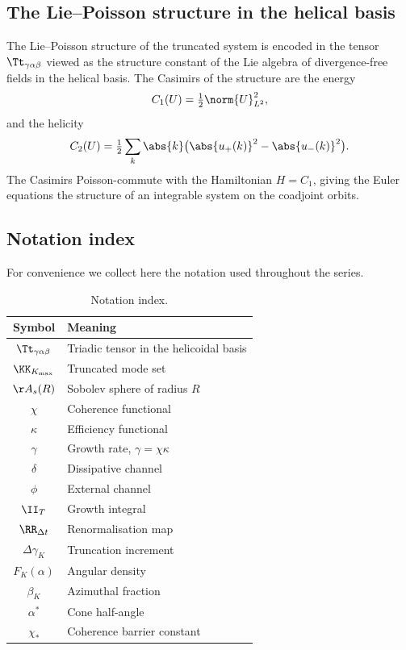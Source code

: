 \subsection{The Lie--Poisson structure in the helical basis}
\label{app:LiePoisson-helical}

The Lie--Poisson structure of the truncated system is encoded in the 
tensor $\Tt_{\gamma\alpha\beta}$ viewed as the structure constant of 
the Lie algebra of divergence-free fields in the helical basis. The 
Casimirs of the structure are the energy
\begin{equation}\label{eq:casimir-1}
C_1(U) = \tfrac12\norm{U}_{L^2}^2,
\end{equation}
and the helicity
\begin{equation}\label{eq:casimir-2}
C_2(U) = \tfrac12\sum_k\abs{k}\bigl(\abs{u_+(k)}^2 - \abs{u_-(k)}^2\bigr).
\end{equation}
The Casimirs Poisson-commute with the Hamiltonian $H = C_1$, 
giving the Euler equations the structure of an integrable system on 
the coadjoint orbits.

\subsection{Notation index}
\label{app:notation}

For convenience we collect here the notation used throughout the 
series.

\begin{table}[h]
\centering
\caption{Notation index.}
\label{tab:notation}
\begin{tabular}{cl}
\toprule
Symbol & Meaning \\
\midrule
$\Tt_{\gamma\alpha\beta}$ & Triadic tensor in the helicoidal basis \\
$\KK_{K_{\max}}$ & Truncated mode set \\
$\AA_s(R)$ & Sobolev sphere of radius $R$ \\
$\chi$ & Coherence functional \\
$\kappa$ & Efficiency functional \\
$\gamma$ & Growth rate, $\gamma = \chi\kappa$ \\
$\delta$ & Dissipative channel \\
$\phi$ & External channel \\
$\II_T$ & Growth integral \\
$\RR_{\Delta t}$ & Renormalisation map \\
$\Delta\gamma_K$ & Truncation increment \\
$F_K(\alpha)$ & Angular density \\
$\beta_K$ & Azimuthal fraction \\
$\alpha^\ast$ & Cone half-angle \\
$\chi_\ast$ & Coherence barrier constant \\
\bottomrule
\end{tabular}
\end{table}

